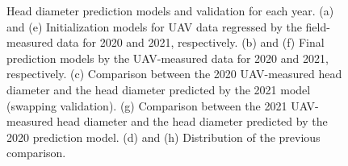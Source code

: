 \begin{figure}[htb]
  \begin{center}
  \end{center}
  \caption[Head diameter prediction models and validation for each year.]{
    Head diameter prediction models and validation for each year. 
    (a) and (e) Initialization models for UAV data regressed by the field-measured data for 2020 and 2021, respectively. 
    (b) and (f) Final prediction models by the UAV-measured data for 2020 and 2021, respectively. 
    (c) Comparison between the 2020 UAV-measured head diameter and the head diameter predicted by the 2021 model (swapping validation). 
    (g) Comparison between the 2021 UAV-measured head diameter and the head diameter predicted by the 2020 prediction model. 
    (d) and (h) Distribution of the previous comparison.
  }
  \label{fig:bro2}
\end{figure}